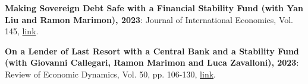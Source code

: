 \documentclass[letterpaper,11pt]{article}
\newcommand{\resumeItem}[2]{
  \item\small{
    \textbf{#1}{: #2 \vspace{-2pt}}
  }
}
\newcommand{\resumeSubItem}[2]{\resumeItem{#1}{#2}\vspace{-1pt}}
\begin{document}
\resumeSubItem{Making Sovereign Debt Safe with a Financial Stability Fund (with Yan Liu and Ramon Marimon), 2023}{Journal of International Economics, Vol. 145, \href{https://www.sciencedirect.com/science/article/pii/S0022199623001204}{link}. } %
\resumeSubItem{On a Lender of Last Resort with a Central Bank and a Stability Fund (with Giovanni Callegari, Ramon Marimon and Luca Zavalloni), 2023}{ Review of Economic Dynamics, Vol. 50, pp. 106-130, \href{https://www.sciencedirect.com/science/article/pii/S1094202523000443?via\%3Dihub}{link}. }%
\end{document}
